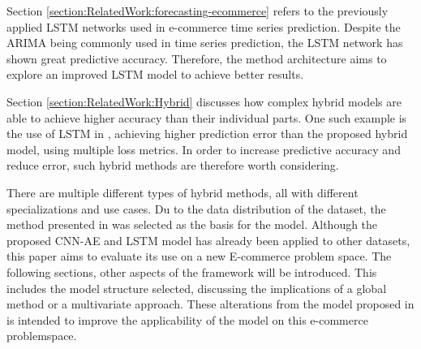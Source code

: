 Section \ref{section:RelatedWork:forecasting-ecommerce}
refers to the previously applied LSTM networks used in e-commerce time series prediction.
Despite the ARIMA being commonly used in time series prediction, the LSTM network has shown great predictive accuracy.
Therefore, the method architecture aims to explore an improved LSTM model to achieve better results.

Section \ref{section:RelatedWork:Hybrid}
discusses how complex hybrid models are able to achieve higher accuracy than their individual parts.
One such example is the use of LSTM in \cite{Zhao2019}, achieving higher prediction error than the proposed hybrid model, using multiple loss metrics.
In order to increase predictive accuracy and reduce error, such hybrid methods are therefore worth considering.


There are multiple different types of hybrid methods, all with different specializations and use cases.
Du to the data distribution of the dataset, the method presented in \cite{Zhao2019} was selected as the basis for the model.
Although the proposed CNN-AE and LSTM model has already been applied to other datasets, this paper aims to evaluate its use on a new E-commerce problem space.
The following sections, other aspects of the framework will be introduced.
This includes the model structure selected, discussing the implications of a global method or a multivariate approach.
These alterations from the model proposed in \cite{Zhao2019} is intended to improve the applicability of the model on this e-commerce problemspace.

